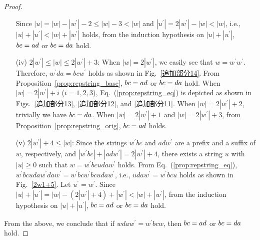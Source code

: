 \begin{proof}
\begin{enumerate}
Since $|u| = |w| - |w^{\prime}| - 2 \leq |w| - 3 < |w|$ and $|u^{\prime}| = 2|w^{\prime}| - |w| < |w|$, i.e., $|u| + |u^{\prime}| < |w| + |w^{\prime}|$ holds, from the induction hypothesis on $|u| + |u^{\prime}|$, $bc = ad$ or $bc = da$ hold.
%
\item[(iv)] $2|w^{\prime}| \le |w| \le 2|w^{\prime}|+3$:
When $|w|=2|w^{\prime}|$, we easily see that $w = w^{\prime}w^{\prime}$.
Therefore, $w^{\prime}da = bcw^{\prime}$ holds as shown in Fig.~\ref{追加部分14}. From Proposition~\ref{prop:repstring_base}, $bc = ad$ or $bc = da$ hold.
When $|w|=2|w^{\prime}|+i$ ($i=1,2,3$), Eq.~(\ref{prop:repstring_eq}) is depicted as shown in Figs.~\ref{追加部分13}, \ref{追加部分12}, and \ref{追加部分11}.
When $|w|=2|w^{\prime}|+2$, trivially we have $bc = da$. 
When $|w|=2|w^{\prime}|+1$ and $|w|=2|w^{\prime}|+3$, from Proposition~\ref{prop:repstring_orig}, $bc = ad$ holds.
%
\item[(v)] $2|w^{\prime}|+4 \leq |w|$:
Since the strings $w^{\prime}bc$ and $adw^{\prime}$ are a prefix and a suffix of $w$, respectively, and $|w^{\prime}bc| + |adw^{\prime}| = 2|w^{\prime}| + 4$, there exists a string $u$ with $|u| \geq 0$ such that $w = w^{\prime}bcudaw^{\prime}$ holds.
From Eq.~(\ref{prop:repstring_eq}), $w^{\prime}bcudaw^{\prime}daw^{\prime} = w^{\prime}bcw^{\prime}bcudaw^{\prime}$, i.e., $udaw^{\prime} = w^{\prime}bcu$ holds as shown in Fig.~\ref{2w1+5}.
Let $u^{\prime} = w^{\prime}$.
Since $|u| + |u^{\prime}| = |w|- (2|w^{\prime}| + 4) + |w^{\prime}| < |w| + |w^{\prime}|$, from the induction hypothesis on $|u| + |u^{\prime}|$, $bc = ad$ or $bc = da$ hold.
\end{enumerate}
From the above, we conclude that if $wdaw^{\prime} = w^{\prime}bcw$, then $bc = ad$ or $bc = da$ hold.
\end{proof}

